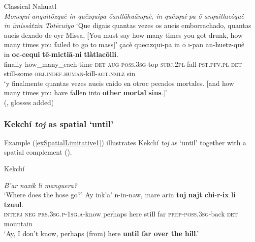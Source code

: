 \begin{exe}
	\ex Classical Nahuatl\label{exOther3}\\
	\textit{Monequi anquìtōzquè in quēzquipa ōantlāhuānquè, in quēzqui-pa ō anquìtlacòquê in īmissàtzin Totēcuiyo}
	\glt \lq Que digais quantas vezes os aueis emborrachado, quantas aueis dexado de oyr Missa, [You must say how many times you got drunk, how many times you failed to go to mass]\rq
	\exi{}\gll  çācè quēcīzqui-pa in ō ī-pan an-huetz-quê in \textbf{oc}-\textbf{cequi} \textbf{tē}-\textbf{mictiā}-\textbf{ni} \textbf{tlàtlacōlli}.\\
	finally how\_many\_each-time \textsc{det} \textsc{aug} \textsc{poss}.3\textsc{sg}-top \textsc{subj}.2\textsc{pl}-fall-\textsc{pst}.\textsc{pfv}.\textsc{pl} \textsc{det} still-some \textsc{obj}.\textsc{indef}.\textsc{human}-kill-\textsc{agt}.\textsc{nmlz} sin\\
	\glt \lq y finalmente quantas vezes aueis caido en otroc pecados mortales. [and how many times you have fallen into \textbf{other} \textbf{mortal} \textbf{sins}.]\rq{}
	\\(\cite[117]{Carochi1645}, glosses added)
\end{exe}

\subsubsection{Kekchí \textit{toj} as spatial \lq until\rq{}} Example (\ref{exSpatialLimitative1}) illustrates Kekchí \textit{toj} as \lq until\rq{ }together with a spatial complement ().

\begin{exe}
	\ex Kekchí\label{exSpatialLimitative1}
	\begin{xlist}
		\textit{B'ar naxik li manguera?}\\
		\lq Where does the hose go?\rq{}
		\gll  Ay ink'a' n-in-naw, mare arin \textbf{toj} \textbf{najt} \textbf{chi}-\textbf{r}-\textbf{ix} \textbf{li} \textbf{tzuul}.\\
	\textsc{interj} \textsc{neg} \textsc{prs}.3\textsc{sg}.\textsc{p}-1\textsc{sg}.\textsc{a}-know perhaps here still far \textsc{prep}-\textsc{poss}.3\textsc{sg}-back \textsc{det} mountain\\
	\glt \lq Ay, I don't know, perhaps (from) here \textbf{until far over the hill}.\rq{ }\parencite[464]{Kockelman2020}
	\end{xlist}
\end{exe}


